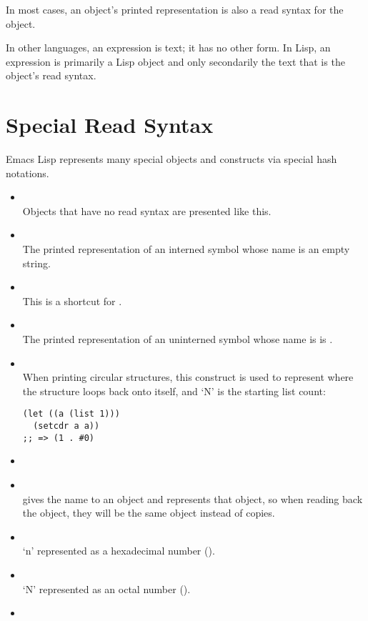 In most cases, an object’s printed representation is also a read syntax for the object.

In other languages, an expression is text; it has no other form.
In Lisp, an expression is primarily a Lisp object and only secondarily the text that is the object’s read syntax.


\section{Special Read Syntax}
\label{sec:special-read-syntax}

Emacs Lisp represents many special objects and constructs via special hash notations.
\begin{itemize}
\item {} \\
  Objects that have no read syntax are presented like this.
\item \keyword{\#\#}\\
  The printed representation of an interned symbol whose name is an empty string.
\item {}\\
  This is a shortcut for .
\item \keyword{\#:}\\
  The printed representation of an uninterned symbol whose name is  is .
\item {}\\
  When printing circular structures, this construct is used to represent where the structure loops back onto itself, and ‘N’ is the starting list count:
\begin{lstlisting}
(let ((a (list 1)))
  (setcdr a a))
;; => (1 . #0)
\end{lstlisting}
\item {}
\item {}\\
   gives the name to an object and  represents that object, so when reading back the object, they will be the same object instead of copies.
\item {}\\
  `n' represented as a hexadecimal number ().
\item {}\\
  `N' represented as an octal number ().
\item {}\\

\end{itemize}
